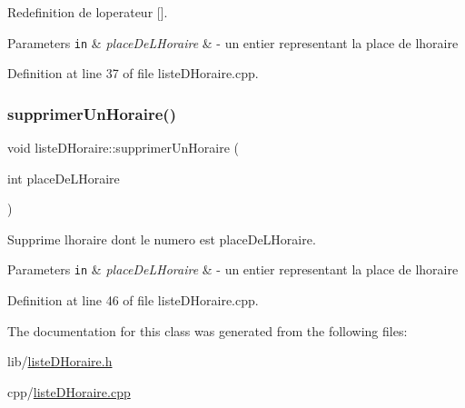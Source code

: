 Redefinition de l\textquotesingle{}operateur \mbox{[}\mbox{]}. 


\begin{DoxyParams}[1]{Parameters}
\mbox{\tt in}  & {\em place\+De\+L\+Horaire} & -\/ un entier representant la place de l\textquotesingle{}horaire \\
\hline
\end{DoxyParams}


Definition at line 37 of file liste\+D\+Horaire.\+cpp.

\hypertarget{classliste_d_horaire_ad7e5d53b1c64285c908f9fe2e60aa61f}{}\label{classliste_d_horaire_ad7e5d53b1c64285c908f9fe2e60aa61f} 
\subsubsection{\texorpdfstring{supprimer\+Un\+Horaire()}{supprimerUnHoraire()}}
{\footnotesize\ttfamily void liste\+D\+Horaire\+::supprimer\+Un\+Horaire (\begin{DoxyParamCaption}\item[{int}]{place\+De\+L\+Horaire }\end{DoxyParamCaption})}



Supprime l\textquotesingle{}horaire dont le numero est place\+De\+L\+Horaire. 


\begin{DoxyParams}[1]{Parameters}
\mbox{\tt in}  & {\em place\+De\+L\+Horaire} & -\/ un entier representant la place de l\textquotesingle{}horaire \\
\hline
\end{DoxyParams}


Definition at line 46 of file liste\+D\+Horaire.\+cpp.



The documentation for this class was generated from the following files\+:\begin{DoxyCompactItemize}
\item 
lib/\hyperlink{liste_d_horaire_8h}{liste\+D\+Horaire.\+h}\item 
cpp/\hyperlink{liste_d_horaire_8cpp}{liste\+D\+Horaire.\+cpp}\end{DoxyCompactItemize}

